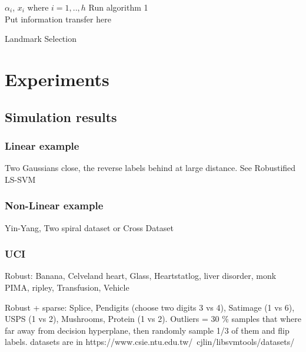 \documentclass[preprint,12pt]{elsarticle}
\begin{document}
\begin{algorithm}[H]
$\alpha_i$, $x_i$ where $i = 1,..,h$ \gets Run algorithm 1 \\
Put information transfer here \\
\caption{Landmark Selection}\label{Algo:LandmarkSelection}
\end{algorithm}

\section{Experiments} 
\subsection{Simulation results} 

\subsubsection{Linear example}

Two Gaussians close, the reverse labels behind at large distance. See Robustified LS-SVM~\cite{debruyne2009robustified}

\subsubsection{Non-Linear example}

Yin-Yang, Two spiral dataset or Cross Dataset~\cite{yang2014robust}

\subsubsection{UCI}

Robust: Banana, Celveland heart, Glass, Heartstatlog, liver disorder, monk PIMA, ripley, Transfusion, Vehicle~\cite{yang2014robust}

Robust + sparse: Splice, Pendigits (choose two digits 3 vs 4), Satimage (1 vs 6), USPS (1 vs 2), Mushrooms, Protein (1 vs 2).\cite{chen2018sparse}
Outliers = 30 \% samples that where far away from decision hyperplane, then randomly sample 1/3 of them and flip labels. datasets are in https://www.csie.ntu.edu.tw/~cjlin/libsvmtools/datasets/ 
\end{document}
